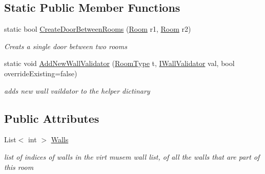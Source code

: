 \subsection*{Static Public Member Functions}
\begin{DoxyCompactItemize}
\item 
static bool \mbox{\hyperlink{class_room_a294bb89a25ac765eca25106ccb4d1955}{Create\+Door\+Between\+Rooms}} (\mbox{\hyperlink{class_room}{Room}} r1, \mbox{\hyperlink{class_room}{Room}} r2)
\begin{DoxyCompactList}\small\item\em Creats a single door between two rooms \end{DoxyCompactList}\item 
static void \mbox{\hyperlink{class_room_a99801f9d1f4ff83d049929183715c680}{Add\+New\+Wall\+Validator}} (\mbox{\hyperlink{_room_8cs_ab540f7414f306325d92272bcef1e34e1}{Room\+Type}} t, \mbox{\hyperlink{interface_i_wall_validator}{I\+Wall\+Validator}} val, bool override\+Existing=false)
\begin{DoxyCompactList}\small\item\em adds new wall vaildator to the helper dictinary \end{DoxyCompactList}\end{DoxyCompactItemize}
\subsection*{Public Attributes}
\begin{DoxyCompactItemize}
\item 
List$<$ int $>$ \mbox{\hyperlink{class_room_a22669d53756bbfecb106f4f6c9529bb9}{Walls}}
\begin{DoxyCompactList}\small\item\em list of indices of walls in the virt musem wall list, of all the walls that are part of this room \end{DoxyCompactList}\end{DoxyCompactItemize}
